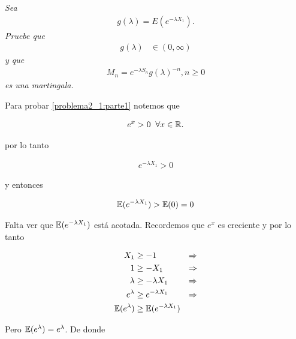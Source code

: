 \emph{
    Sea
        \begin{align}
                g(\lambda)=E(e^{- \lambda X_1}).
        \end{align} 
    Pruebe que 
    \null
        \begin{align}
                g(\lambda)    &\in (0,\infty)\label{problema2_1:parte1}
        \end{align}
    \null
    y que
    \null
        \begin{align}
                M_n=e^{-\lambda S_n}g(\lambda)^{-n},n\geq 0
        \end{align}
    \null
    es una martingala.
}

\afterstatement

    Para probar \eqref{problema2_1:parte1} notemos que

    \begin{align}
        e^x > 0 \;\; \forall x \in \mathbb{R}.
    \end{align}\par\null

    por lo tanto

    \begin{align}
        e^{-\lambda X_1} > 0
    \end{align}\par\null

    y entonces

    \begin{align}
        \mathbb{E}(e^{-\lambda X_1}) >\mathbb{E}(0) = 0
    \end{align}\par\null

    Falta ver que $\mathbb{E}(e^{-\lambda X_1})$ está acotada. Recordemos que $e^x$ es creciente y por lo tanto

    \begin{align}
        X_1                &\geq     -1                       & \Rightarrow\\
        1                  &\geq     - X_1                    & \Rightarrow\\
        \lambda            &\geq     - \lambda X_1            & \Rightarrow\\
        e^{\lambda}        &\geq     e^{- \lambda X_1}        & \Rightarrow\\
        \mathbb{E}(e^{\lambda})    &\geq     \mathbb{E}(e^{- \lambda X_1})
    \end{align}\par\null
    
    Pero $\mathbb{E}(e^{\lambda}) = e^{\lambda}$. De donde
    
